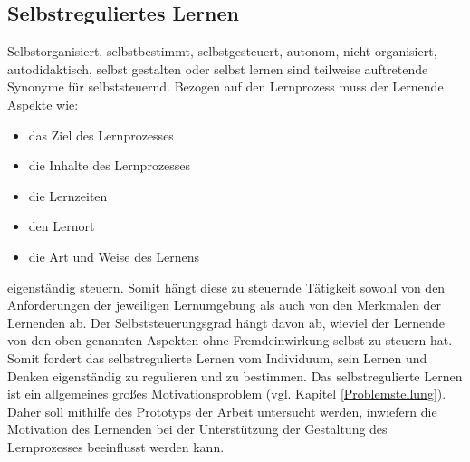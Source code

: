         
        \subsection{Selbstreguliertes Lernen} \label{selbstgesteurtesLernen}
            Selbstorganisiert, selbstbestimmt, selbstgesteuert, autonom, nicht-organisiert, autodidaktisch, selbst gestalten oder selbst lernen sind teilweise auftretende Synonyme für selbststeuernd.
            Bezogen auf den Lernprozess muss der Lernende Aspekte wie:

            \begin{minipage}[t]{0.5\textwidth}
                \begin{itemize}
                \item das Ziel des Lernprozesses
                \item die Inhalte des Lernprozesses
                \item die Lernzeiten\\
            \end{itemize}
            \end{minipage}
            \hfill
            \begin{minipage}[t]{0.5\textwidth}
                \begin{itemize}
                \item den Lernort 
                \item die Art und Weise des Lernens  
                \end{itemize}
            \end{minipage}
            eigenständig steuern. Somit hängt diese zu steuernde Tätigkeit sowohl von den Anforderungen der jeweiligen Lernumgebung
            als auch von den Merkmalen der Lernenden ab.
            Der Selbststeuerungsgrad hängt davon ab, wieviel der Lernende von den oben genannten Aspekten ohne Fremdeinwirkung selbst zu steuern hat. \parencite[14 f.]{Dietrich.2007} \parencite[195]{Cress.2000}
            Somit fordert das selbstregulierte Lernen vom Individuum, sein Lernen und Denken eigenständig zu regulieren und zu bestimmen. \parencite[45]{Groß.2017} 
            Das selbstregulierte Lernen ist ein allgemeines großes Motivationsproblem (vgl. Kapitel \ref{Problemstellung}).
            Daher soll mithilfe des Prototyps der Arbeit untersucht werden, inwiefern die Motivation des Lernenden bei der Unterstützung der Gestaltung des Lernprozesses beeinflusst werden kann.

        
